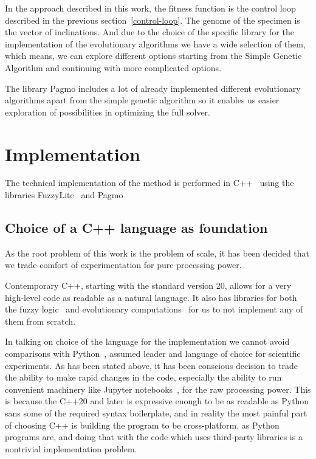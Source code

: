\documentclass[11pt, a4paper]{article}
\begin{document}
  In the approach described in this work, the fitness function is the control loop described in the previous section~\ref{control-loop}.
  The genome of the specimen is the vector of inclinations.
	And due to the choice of the specific library for the implementation of the evolutionary algorithms we have a wide selection of them,
  which means, we can explore different options starting from the Simple Genetic Algorithm and continuing with more complicated options.

	The library Pagmo \cite{Biscani2020} includes a lot of already implemented different evolutionary algorithms apart from the simple genetic algorithm so it enables us easier exploration of possibilities in optimizing the full solver.

	\section{Implementation}

	The technical implementation of the method is performed in C++~\cite{ppp3} using the libraries FuzzyLite~\cite{fl::fuzzylite} and Pagmo~\cite{Biscani2020}

	\subsection{Choice of a C++ language as foundation}

	As the root problem of this work is the problem of scale, it has been decided that we trade comfort of experimentation for pure processing power.

	Contemporary C++, starting with the standard version 20, allows for a very high-level code as readable as a natural language.
  It also has libraries for both the fuzzy logic~\cite{fl::fuzzylite} and evolutionary computations~\cite{Biscani2020} for us to not implement any of them from scratch.

	In talking on choice of the language for the implementation we cannot avoid comparisons with Python~\cite{Python}, assumed leader and language of choice for scientific experiments.
	As has been stated above, it has been conscious decision to trade the ability to make rapid changes in the code, especially the ability to run convenient machinery like Jupyter notebooks~\cite{JupyterNotebooks}, for the raw processing power.
	This is because the C++20 and later is expressive enough to be as readable as Python sans some of the required syntax boilerplate, and in reality the most painful part of choosing C++ is building the program to be cross-platform, as Python programs are, and doing that with the code which uses third-party libraries is a nontrivial implementation problem.
\end{document}
